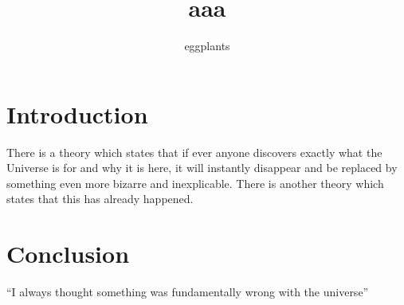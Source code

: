 \documentclass{article}
\title{aaa}
\author{eggplants}
\begin{document}
\maketitle

\section{Introduction}
There is a theory which states that if ever anyone discovers exactly what the Universe is for and why it is here, it will instantly disappear and be replaced by something even more bizarre and inexplicable.
There is another theory which states that this has already happened.

\section{Conclusion}
``I always thought something was fundamentally wrong with the universe''
\end{document}
